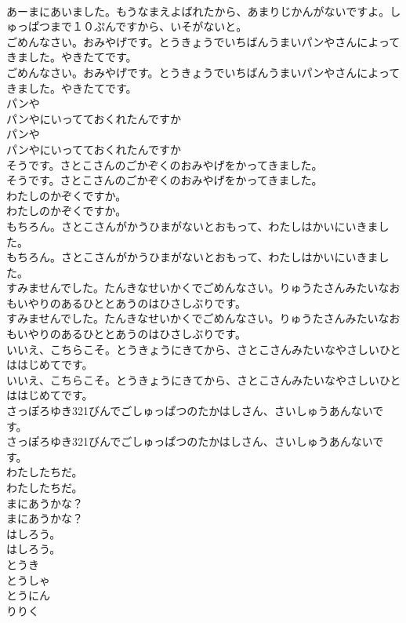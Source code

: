 \documentclass[8pt]{extreport}
\begin{document}
\begin{CJK}{UTF8}{min}
\\	あーまにあいました。もうなまえよばれたから、あまりじかんがないですよ。しゅっぱつまで１０ぷんですから、いそがないと。
\\	ごめんなさい。おみやげです。とうきょうでいちばんうまいパンやさんによってきました。やきたてです。
\\	ごめんなさい。おみやげです。とうきょうでいちばんうまいパンやさんによってきました。やきたてです。
\\	パンや
\\	パンやにいってておくれたんですか
\\	パンや
\\	パンやにいってておくれたんですか
\\	そうです。さとこさんのごかぞくのおみやげをかってきました。
\\	そうです。さとこさんのごかぞくのおみやげをかってきました。
\\	わたしのかぞくですか。
\\	わたしのかぞくですか。
\\	もちろん。さとこさんがかうひまがないとおもって、わたしはかいにいきました。
\\	もちろん。さとこさんがかうひまがないとおもって、わたしはかいにいきました。
\\	すみませんでした。たんきなせいかくでごめんなさい。りゅうたさんみたいなおもいやりのあるひととあうのはひさしぶりです。
\\	すみませんでした。たんきなせいかくでごめんなさい。りゅうたさんみたいなおもいやりのあるひととあうのはひさしぶりです。
\\	いいえ、こちらこそ。とうきょうにきてから、さとこさんみたいなやさしいひとははじめてです。
\\	いいえ、こちらこそ。とうきょうにきてから、さとこさんみたいなやさしいひとははじめてです。
\\	さっぽろゆき321びんでごしゅっぱつのたかはしさん、さいしゅうあんないです。
\\	さっぽろゆき321びんでごしゅっぱつのたかはしさん、さいしゅうあんないです。
\\	わたしたちだ。
\\	わたしたちだ。
\\	まにあうかな？
\\	まにあうかな？
\\	はしろう。
\\	はしろう。
\\	とうき
\\	とうしゃ
\\	とうにん
\\	りりく

\end{CJK}
\end{document}
